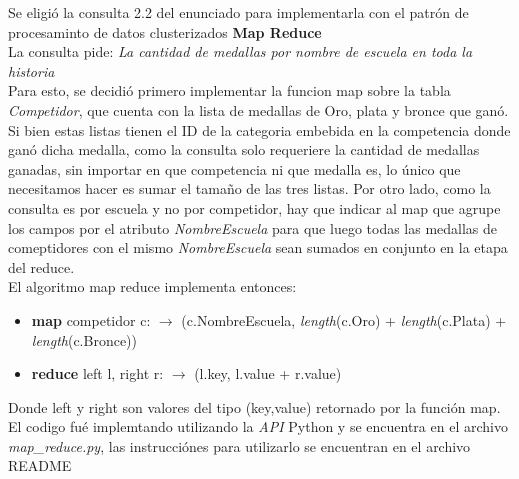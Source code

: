 Se eligió la consulta 2.2 del enunciado para implementarla con el patrón de procesaminto de datos clusterizados \textbf{Map Reduce} \\

La consulta pide: \textit{La cantidad de medallas por nombre de escuela en toda la historia} \\

Para esto, se decidió primero implementar la funcion map sobre la tabla \textit{Competidor}, que cuenta con la lista de medallas de Oro, plata y bronce que ganó. Si bien estas listas tienen el ID de la categoria embebida en la competencia donde ganó dicha medalla, como la consulta solo requeriere la cantidad de medallas ganadas, sin importar en que competencia ni que medalla es, lo único que necesitamos hacer es sumar el tamaño de las tres listas. Por otro lado, como la consulta es por escuela y no por competidor, hay que indicar al map que agrupe los campos por el atributo \textit{NombreEscuela} para que luego todas las medallas de comeptidores con el mismo \textit{NombreEscuela} sean sumados en conjunto en la etapa del reduce. \\ 

El algoritmo map reduce implementa entonces:
\begin{itemize}
\item \textbf{map} competidor c: $\rightarrow$ (c.NombreEscuela, \textit{length}(c.Oro) + \textit{length}(c.Plata) + \textit{length}(c.Bronce))
\item \textbf{reduce} left l, right r: $\rightarrow$ (l.key, l.value + r.value)
\end{itemize}
Donde left y right son valores del tipo (key,value) retornado por la función map. \\

El codigo fué implemtando utilizando la \textit{API} Python y se encuentra en el archivo \textit{map_reduce.py}, las instrucciónes para utilizarlo se encuentran en el archivo README